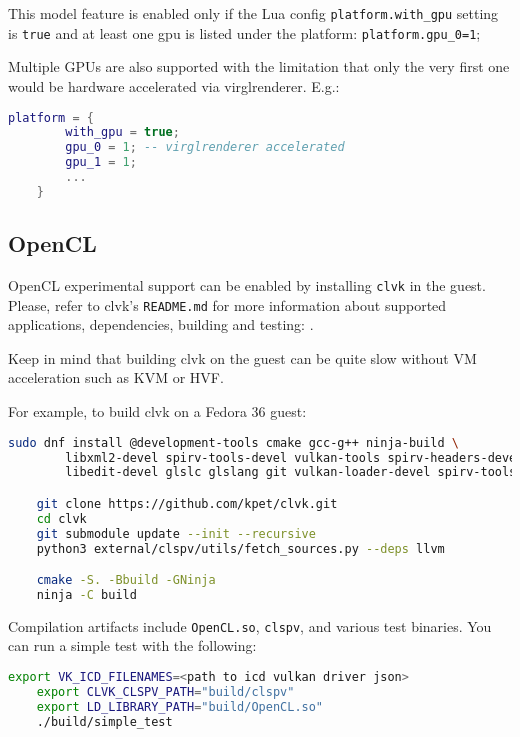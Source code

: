 This model feature is enabled only if the Lua config
{\small{\lstinline!platform.with_gpu!}} setting is {\small{\lstinline!true!}}
and at least one gpu is listed under the platform:
{\small{\lstinline!platform.gpu_0=1!}};

Multiple GPUs are also supported with the limitation that only the very first
one would be hardware accelerated via virglrenderer. E.g.:

\small
\begin{lstlisting}[language=lua]
    platform = {
        with_gpu = true;
        gpu_0 = 1; -- virglrenderer accelerated
        gpu_1 = 1;
        ...
    }
\end{lstlisting}
\normalsize


\subsection{OpenCL}
\label{sec:openCL}

OpenCL experimental support can be enabled by installing
{\small{\lstinline!clvk!}} in the guest. Please, refer to clvk's
{\small{\lstinline!README.md!}} for more information about supported
applications, dependencies, building and testing: {}.

\note Keep in mind that building clvk on the guest can be quite slow without VM
acceleration such as KVM or HVF.

For example, to build clvk on a Fedora 36 guest:

\small
\begin{lstlisting}[language=bash]
    sudo dnf install @development-tools cmake gcc-g++ ninja-build \
        libxml2-devel spirv-tools-devel vulkan-tools spirv-headers-devel \
        libedit-devel glslc glslang git vulkan-loader-devel spirv-tools

    git clone https://github.com/kpet/clvk.git
    cd clvk
    git submodule update --init --recursive
    python3 external/clspv/utils/fetch_sources.py --deps llvm

    cmake -S. -Bbuild -GNinja
    ninja -C build
\end{lstlisting}
\normalsize

Compilation artifacts include {\small{\lstinline!OpenCL.so!}},
{\small{\lstinline!clspv!}}, and various test binaries. You can run a simple
test with the following:

\small
\begin{lstlisting}[language=bash]
    export VK_ICD_FILENAMES=<path to icd vulkan driver json>
    export CLVK_CLSPV_PATH="build/clspv"
    export LD_LIBRARY_PATH="build/OpenCL.so"
    ./build/simple_test
\end{lstlisting}
\normalsize

